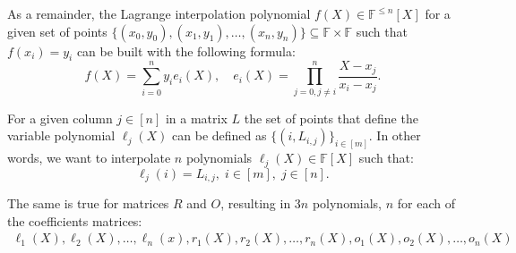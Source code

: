 \documentclass[../lecture-notes-148x210.tex]{subfiles}
\begin{document}
\begin{remark}
    As a remainder, the Lagrange interpolation polynomial $f(X) \in
    \mathbb{F}^{\leq n}[X]$ for a given set of points
    $\{(x_0,y_0),(x_1,y_1),\dots,(x_n,y_n)\} \subseteq \mathbb{F} \times
    \mathbb{F}$ such that $f(x_i)=y_i$ can be built with the following formula:
    \begin{equation*}
        f(X) = \sum_{i=0}^{n} y_i e_i(X), \quad e_i(X) = \prod_{j=0, j \neq i}^{n} \frac{X-x_j}{x_i-x_j}.
    \end{equation*}  
\end{remark}

For a given column $j \in [n]$ in a matrix $L$ the set of points that define the
variable polynomial $\ell_j(X)$ can be defined as $\{(i, L_{i,j})\}_{i \in
[m]}$. In other words, we want to interpolate $n$ polynomials $\ell_j(X) \in
\mathbb{F}[X]$ such that:
\begin{equation*}
    \ell_j(i) = L_{i,j}, \; i \in [m], \; j \in [n].
\end{equation*}

The same is true for matrices $R$ and $O$, resulting in $3n$ polynomials, $n$ for each of the
coefficients matrices:
\begin{align*}
    \ell_1(X), \ell_2(X), \dots, \ell_n(x), 
    r_1(X), r_2(X), \dots, r_n(X),
    o_1(X), o_2(X), \dots, o_n(X)
\end{align*}
\end{document}
